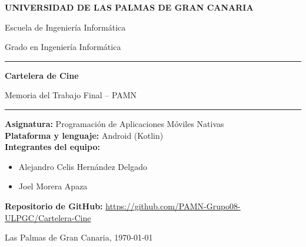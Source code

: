 \documentclass[11pt,a4paper]{article}
\begin{document}
\begin{titlepage}
    \centering
    \vspace*{1.5cm}
    {\Large\textbf{UNIVERSIDAD DE LAS PALMAS DE GRAN CANARIA}\par}
    \vspace{0.3cm}
    {\large Escuela de Ingeniería Informática\par}
    \vspace{0.2cm}
    {\normalsize Grado en Ingeniería Informática\par}

    \vspace{2.5cm}
    {\color{ulpgcblue}\rule{\linewidth}{1.5pt}\par}
    \vspace{0.4cm}
    {\Huge\bfseries\textcolor{ulpgcblue}{Cartelera de Cine}\par}
    \vspace{0.3cm}
    {\Large Memoria del Trabajo Final -- PAMN\par}
    \vspace{0.2cm}
    {\color{ulpgcblue}\rule{\linewidth}{1.5pt}\par}

    \vspace{2cm}
    \begin{flushleft}
        \textbf{Asignatura:} Programación de Aplicaciones Móviles Nativas\\
        \textbf{Plataforma y lenguaje:} Android (Kotlin)\\[0.4cm]
        \textbf{Integrantes del equipo:}
        \begin{itemize}[leftmargin=1.5cm]
            \item Alejandro Celis Hernández Delgado
            \item Joel Morera Apaza
        \end{itemize}
        \vspace{0.4cm}
        \textbf{Repositorio de GitHub:} \url{https://github.com/PAMN-Grupo08-ULPGC/Cartelera-Cine}
    \end{flushleft}

    \vfill
    {\large Las Palmas de Gran Canaria, \today\par}
\end{titlepage}

\tableofcontents
\newpage

\end{document}
